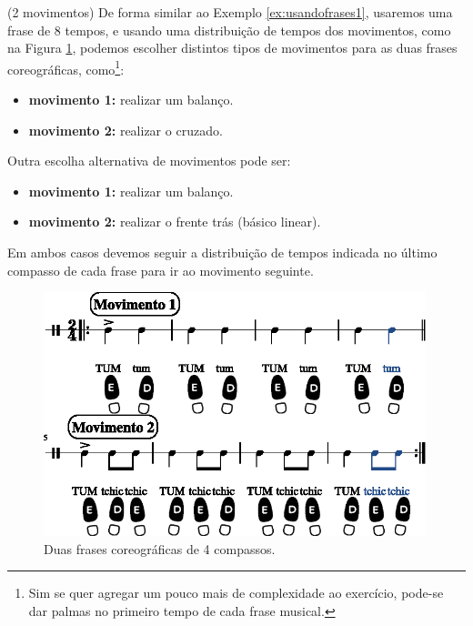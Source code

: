 \begin{example}(2 movimentos)
De forma similar ao Exemplo \ref{ex:usandofrases1},
usaremos uma frase de 8 tempos, 
e usando uma distribuição de tempos dos movimentos, como na Figura \ref{fig:frasecoreografica1a}, 
podemos escolher distintos tipos de movimentos para as duas  frases coreográficas, 
como\footnote{Sim 
se quer agregar um pouco mais de complexidade ao exercício,
pode-se dar palmas no primeiro tempo de cada frase musical.}:
\begin{itemize}
\item \textbf{movimento 1:} realizar um balanço.
\item \textbf{movimento 2:} realizar o cruzado.
\end{itemize}
Outra  escolha alternativa de movimentos pode ser:
\begin{itemize}
\item \textbf{movimento 1:} realizar um balanço.
\item \textbf{movimento 2:} realizar o frente trás (básico linear).
\end{itemize}
Em ambos casos devemos seguir a distribuição de tempos indicada no último compasso de cada frase 
para ir ao movimento seguinte.
\end{example}

\begin{figure}[!h]
    \centering
    \includegraphics[width=0.99\textwidth]{chapters/cap-musicalidade/treino-fraseio1a-1.eps}
    \caption{Duas frases coreográficas de 4 compassos.}
    \label{fig:frasecoreografica1a}
\end{figure}


